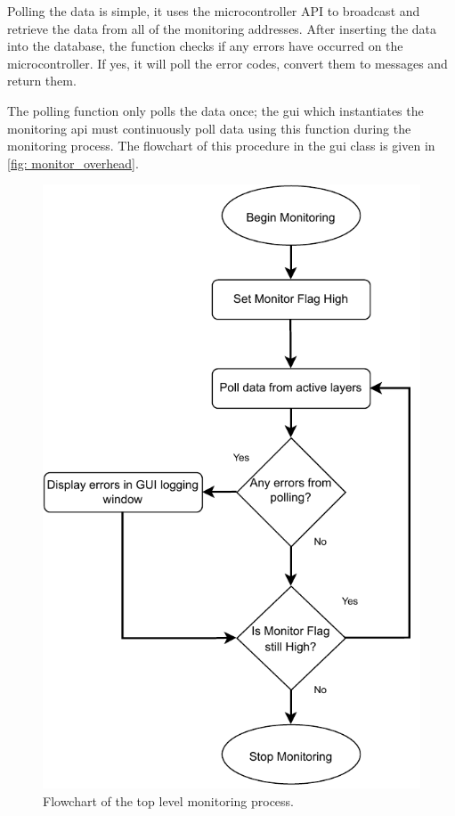 \documentclass[main.tex]{subfiles}
\begin{document}
Polling the data is simple, it uses the microcontroller API to broadcast and retrieve the data from all of the monitoring addresses. After inserting the data into the database, the function checks if any errors have occurred on the microcontroller. If yes, it will poll the error codes, convert them to messages and return them.

The polling function only polls the data once; the \gls{gui} which instantiates the monitoring \gls{api} must continuously poll data using this function during the monitoring process. The flowchart of this procedure in the \gls{gui} class is given in \autoref{fig: monitor_overhead}.

\begin{figure}[!ht]
    \centering
    \includegraphics[scale=0.9]{images/polling_overhead.pdf}
    \caption{Flowchart of the top level monitoring process.}
    \label{fig: monitor_overhead}
\end{figure}
\FloatBarrier
\end{document}
